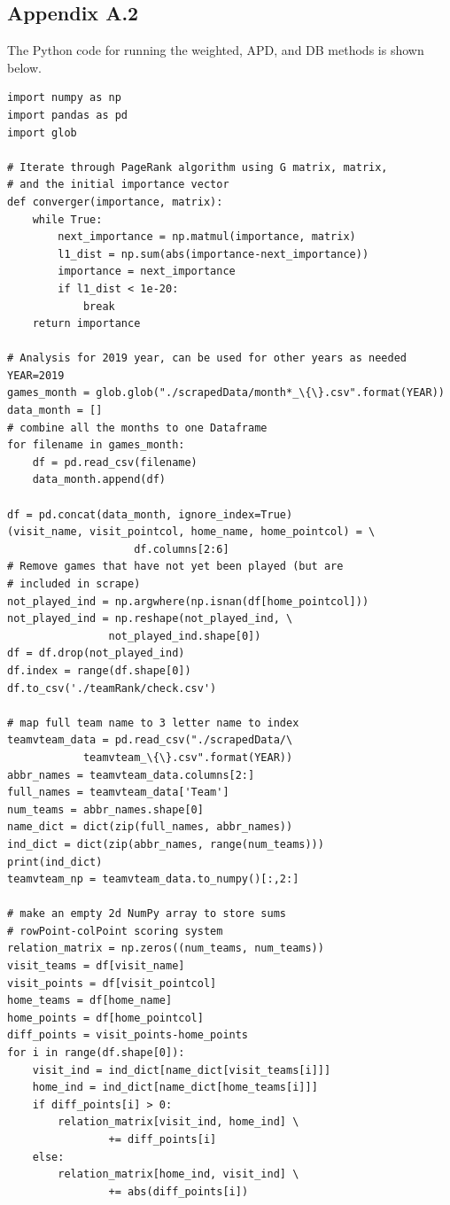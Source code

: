 \documentclass[12pt]{article}%
\begin{document}
\subsection{Appendix A.2}
The Python code for running the weighted, APD, and DB methods is shown below.
\begin{lstlisting}
import numpy as np
import pandas as pd
import glob

# Iterate through PageRank algorithm using G matrix, matrix, 
# and the initial importance vector
def converger(importance, matrix):
	while True:
		next_importance = np.matmul(importance, matrix)
		l1_dist = np.sum(abs(importance-next_importance))
		importance = next_importance
		if l1_dist < 1e-20:
			break
	return importance

# Analysis for 2019 year, can be used for other years as needed
YEAR=2019
games_month = glob.glob("./scrapedData/month*_\{\}.csv".format(YEAR))
data_month = []
# combine all the months to one Dataframe
for filename in games_month:
	df = pd.read_csv(filename)
	data_month.append(df)

df = pd.concat(data_month, ignore_index=True)
(visit_name, visit_pointcol, home_name, home_pointcol) = \
					df.columns[2:6]
# Remove games that have not yet been played (but are 
# included in scrape)
not_played_ind = np.argwhere(np.isnan(df[home_pointcol]))
not_played_ind = np.reshape(not_played_ind, \
				not_played_ind.shape[0])
df = df.drop(not_played_ind)
df.index = range(df.shape[0])
df.to_csv('./teamRank/check.csv')

# map full team name to 3 letter name to index
teamvteam_data = pd.read_csv("./scrapedData/\
			teamvteam_\{\}.csv".format(YEAR))
abbr_names = teamvteam_data.columns[2:]
full_names = teamvteam_data['Team']
num_teams = abbr_names.shape[0]
name_dict = dict(zip(full_names, abbr_names))
ind_dict = dict(zip(abbr_names, range(num_teams)))
print(ind_dict)
teamvteam_np = teamvteam_data.to_numpy()[:,2:]

# make an empty 2d NumPy array to store sums
# rowPoint-colPoint scoring system
relation_matrix = np.zeros((num_teams, num_teams))
visit_teams = df[visit_name]
visit_points = df[visit_pointcol]
home_teams = df[home_name]
home_points = df[home_pointcol]
diff_points = visit_points-home_points
for i in range(df.shape[0]):
	visit_ind = ind_dict[name_dict[visit_teams[i]]]
	home_ind = ind_dict[name_dict[home_teams[i]]]
	if diff_points[i] > 0:
		relation_matrix[visit_ind, home_ind] \
				+= diff_points[i]
	else:
		relation_matrix[home_ind, visit_ind] \
				+= abs(diff_points[i])


\end{lstlisting}
\end{document}
